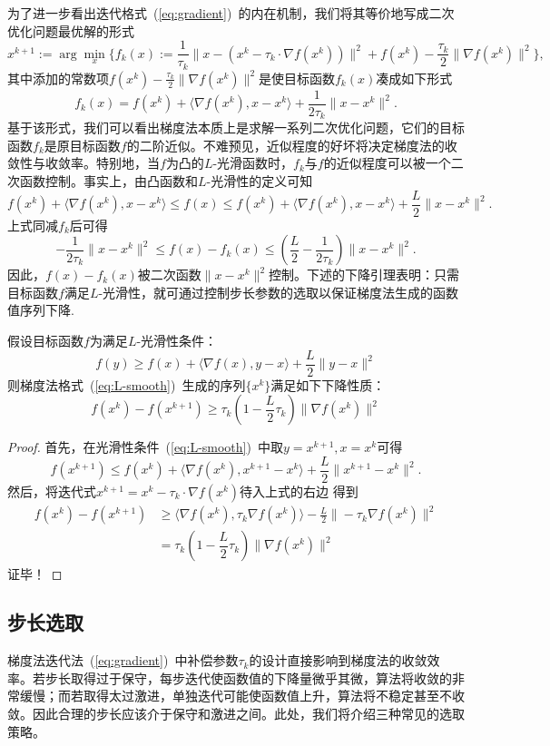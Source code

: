 为了进一步看出迭代格式~(\ref{eq:gradient})~的内在机制，我们将其等价地写成二次优化问题最优解的形式
\[
    x^{k+1}:=\arg\min_{x}\{f_{k}(x):=\frac{1}{\tau_{k}}\|x-(x^{k}-\tau_{k}\cdot\nabla f(x^{k}))\|^{2}+f(x^{k})-\frac{\tau_{k}}{2}\|\nabla f(x^{k})\|^{2}\},
\]
其中添加的常数项$f(x^k)-\frac{\tau_k}2\|\nabla f(x^k)\|^2$是使目标函数$f_{k}(x)$凑成如下形式
\[
    f_{k}(x)=f(x^{k})+\langle\nabla f(x^{k}),x-x^{k}\rangle+\frac{1}{2\tau_{k}}\|x-x^{k}\|^{2}.
\]
基于该形式，我们可以看出梯度法本质上是求解一系列二次优化问题，它们的目标函数$f_k$是原目标函数$f$的二阶近似。不难预见，近似程度的好坏将决定梯度法的收敛性与收敛率。特别地，当$f$为凸的$L$-光滑函数时，$f_k$与$f$的近似程度可以被一个二次函数控制。事实上，由凸函数和$L$-光滑性的定义可知
\[
    f(x^k)+\langle\nabla f(x^k),x-x^k\rangle\leq f(x)\leq f(x^k)+\langle\nabla f(x^k),x-x^k\rangle+\frac{L}{2}\|x-x^k\|^2.
\]
上式同减$f_k$后可得
\[
    -\frac1{2\tau_k}\|x-x^k\|^2\leq f(x)-f_k(x)\leq(\frac L2-\frac1{2\tau_k})\|x-x^k\|^2.
\]
因此，$f(x)-f_k(x)$被二次函数$\|x-x^k\|^2$控制。下述的下降引理表明：只需目标函数$f$满足$L$-光滑性，就可通过控制步长参数的选取以保证梯度法生成的函数值序列下降.
\begin{theorem}[基本下降引理]
    假设目标函数$f$为满足$L$-光滑性条件：
    \begin{equation}\label{eq:L-smooth}
        f(y)\geq f(x) + \langle \nabla f(x),y-x \rangle + \frac{L}{2}\| y-x \|^2
    \end{equation}
    则梯度法格式~(\ref{eq:L-smooth})~生成的序列$\{x^k\}$满足如下下降性质：
    \begin{equation}\label{eq:LowDown}
        f(x^k)-f(x^{k+1})\geq \tau_k(1-\frac{L}{2}\tau_k)\| \nabla f(x^k) \|^2
    \end{equation}
\end{theorem}
\begin{proof}
    首先，在光滑性条件~(\ref{eq:L-smooth})~中取$y = x^{k+1},x = x^k$可得
    \[
        f(x^{k+1})\leq f(x^k)+\langle\nabla f(x^k),x^{k+1}-x^k\rangle+\frac L2\|x^{k+1}-x^k\|^2.
    \]
    然后，将迭代式$x^{k+1} = x^k-\tau_k \cdot \nabla f(x^k)$待入上式的右边
    得到
    \[
        \begin{array}{ll}
            f(x^k)-f(x^{k+1})&\geq \langle \nabla f(x^k),\tau_k \nabla f(x^k)  \rangle -\frac{L}{2}\| -\tau_k \nabla f(x^k)  \|^2\\
            & = \tau_k(1-\dfrac{L}{2}\tau_k)\|\nabla f(x^k)\|^2
        \end{array}  
    \]
    证毕！
\end{proof}
\subsection{步长选取}
梯度法迭代法~(\ref{eq:gradient})~中补偿参数$\tau_k$的设计直接影响到梯度法的收敛效率。若步长取得过于保守，每步迭代使函数值的下降量微乎其微，算法将收敛的非常缓慢；而若取得太过激进，单独迭代可能使函数值上升，算法将不稳定甚至不收敛。因此合理的步长应该介于保守和激进之间。此处，我们将介绍三种常见的选取策略。

